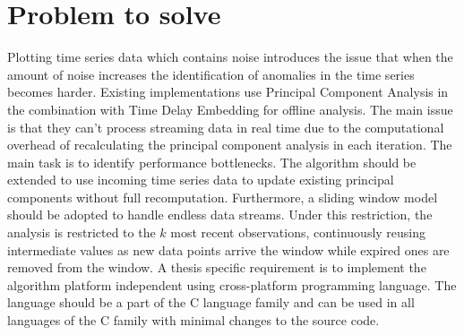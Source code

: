 \section{{Problem to solve}}
Plotting time series data which contains noise introduces the issue that when the amount of noise increases the identification of anomalies in the time series becomes harder.
Existing implementations use Principal Component Analysis in the combination with Time Delay Embedding for offline analysis. The main issue is that they can't process streaming data in real time due to the computational overhead of recalculating the principal component analysis in each iteration. The main task is to identify performance bottlenecks.
The algorithm should be extended to use incoming time series data to update existing principal components without full recomputation. Furthermore, a sliding window model should be adopted to handle endless data streams. Under this restriction, the analysis is restricted to the $k$ most recent observations, continuously reusing intermediate values as new data points arrive the window while expired ones are removed from the window.
A thesis specific requirement is to implement the algorithm platform independent using cross-platform programming language. The language should be a part of  the C language family and can be used in all languages of the C family with minimal changes to the source code.